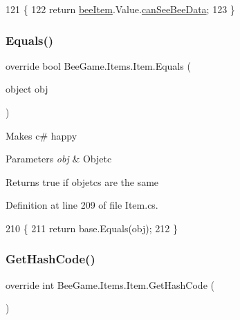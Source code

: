 \begin{DoxyCode}
121         \{
122             \textcolor{keywordflow}{return} \hyperlink{struct_bee_game_1_1_items_1_1_item_a0593f3b7b3ff5daa864f3c6d0ccd77ca}{beeItem}.Value.\hyperlink{struct_bee_game_1_1_bee_1_1_bee_data_a9d7e31a11e286cf83d8b350557af42f7}{canSeeBeeData};
123         \}
\end{DoxyCode}
\mbox{\label{struct_bee_game_1_1_items_1_1_item_adb0ce56e232551efc18b4e4c6e3fc1ae}} 
\subsubsection{\texorpdfstring{Equals()}{Equals()}}
{\footnotesize\ttfamily override bool Bee\+Game.\+Items.\+Item.\+Equals (\begin{DoxyParamCaption}\item[{object}]{obj }\end{DoxyParamCaption})}



Makes c\# happy 


\begin{DoxyParams}{Parameters}
{\em obj} & Objetc\\
\hline
\end{DoxyParams}
\begin{DoxyReturn}{Returns}
true if objetcs are the same
\end{DoxyReturn}


Definition at line 209 of file Item.\+cs.


\begin{DoxyCode}
210         \{
211             \textcolor{keywordflow}{return} base.Equals(obj);
212         \}
\end{DoxyCode}
\mbox{\label{struct_bee_game_1_1_items_1_1_item_a6fc3c59404158c419ce0128802cbad60}} 
\subsubsection{\texorpdfstring{Get\+Hash\+Code()}{GetHashCode()}}
{\footnotesize\ttfamily override int Bee\+Game.\+Items.\+Item.\+Get\+Hash\+Code (\begin{DoxyParamCaption}{ }\end{DoxyParamCaption})}



